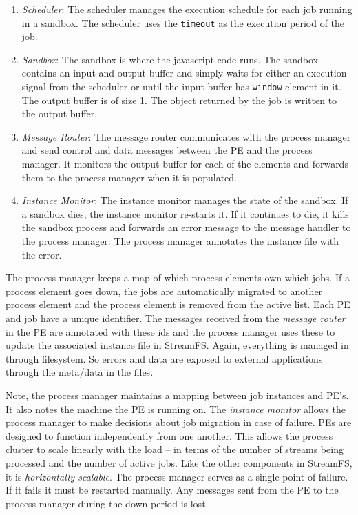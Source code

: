 \begin{enumerate}
\item \emph{Scheduler}: The scheduler manages the execution schedule for each job running in a sandbox.  The scheduler uses
the \texttt{timeout} as the execution period of the job.

\item \emph{Sandbox}:  The sandbox is where the javascript code runs.  The sandbox contains an input and output buffer and simply 
waits for either an execution signal from the scheduler or until the input buffer has \texttt{window} element in it.  The output
buffer is of size 1.  The object returned by the job is written to the output buffer.

\item \emph{Message Router}:  The message router communicates with the process manager and send control and data messages between
the PE and the process manager.  It monitors the output buffer for each of the elements and forwards them to the process manager 
when it is populated.

\item \emph{Instance Monitor}:  The instance monitor manages the state of the sandbox.  If a sandbox dies, the instance monitor re-starts
it.  If it continues to die, it kills the sandbox process and forwards an error message to the message handler to the process manager.
The process manager annotates the instance file with the error.

\end{enumerate}


The process manager keeps a map of which process elements own which jobs.  If a process element goes down, the jobs are automatically
migrated to another process element and the process element is removed from the active list.  Each PE and job have a unique identifier.
The messages received from the \emph{message router} in the PE are annotated with these ids and the process manager uses these
to update the associated instance file in StreamFS.  Again, everything is managed in through filesystem.  So errors and data
are exposed to external applications through the meta/data in the files.

Note, the process manager maintains a mapping between job instances and PE's.  It also notes the machine the PE is running on.  The
\emph{instance monitor} allows the process manager to make decisions about job migration in case of failure.  PEs are designed
to function independently from one another.  This allows the process cluster to scale linearly with the load -- in terms of
the number of streams being processed and the number of active jobs.  Like the other components in StreamFS, it is 
\emph{horizontally scalable}.  The process manager serves as a single point of failure.  If it fails it must be restarted manually.
Any messages sent from the PE to the process manager during the down period is lost.

